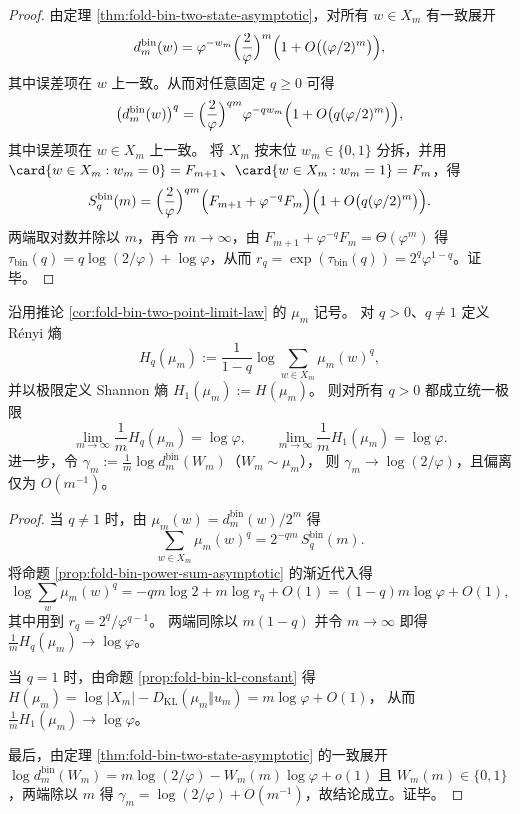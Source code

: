 \begin{proof}
由定理 \ref{thm:fold-bin-two-state-asymptotic}，对所有 \(w\in X_m\) 有一致展开
\[
d^{\mathrm{bin}}_m(w)=\varphi^{-w_m}\Bigl(\frac{2}{\varphi}\Bigr)^m\Bigl(1+O\bigl((\varphi/2)^m\bigr)\Bigr),
\]
其中误差项在 \(w\) 上一致。从而对任意固定 \(q\ge 0\) 可得
\[
\bigl(d^{\mathrm{bin}}_m(w)\bigr)^q
=\Bigl(\frac{2}{\varphi}\Bigr)^{qm}\varphi^{-q w_m}\Bigl(1+O\bigl(q(\varphi/2)^m\bigr)\Bigr),
\]
其中误差项在 \(w\in X_m\) 上一致。
将 \(X_m\) 按末位 \(w_m\in\{0,1\}\) 分拆，并用
\(
\card\{w\in X_m:w_m=0\}=F_{m+1}
\)、\(
\card\{w\in X_m:w_m=1\}=F_{m}
\)，得
\[
S_q^{\mathrm{bin}}(m)
=\Bigl(\frac{2}{\varphi}\Bigr)^{qm}\Bigl(F_{m+1}+\varphi^{-q}F_m\Bigr)\Bigl(1+O\bigl(q(\varphi/2)^m\bigr)\Bigr).
\]
两端取对数并除以 \(m\)，再令 \(m\to\infty\)，由 \(F_{m+1}+\varphi^{-q}F_m=\Theta(\varphi^m)\) 得
\(\tau_{\mathrm{bin}}(q)=q\log(2/\varphi)+\log\varphi\)，从而 \(r_q=\exp(\tau_{\mathrm{bin}}(q))=2^q\varphi^{1-q}\)。证毕。
\end{proof}

\begin{theorem}\label{thm:fold-bin-renyi-rate-collapse}
沿用推论 \ref{cor:fold-bin-two-point-limit-law} 的 \(\mu_m\) 记号。
对 \(q>0\)、\(q\neq 1\) 定义 R\'enyi 熵
\[
H_q(\mu_m):=\frac{1}{1-q}\log\sum_{w\in X_m}\mu_m(w)^q,
\]
并以极限定义 Shannon 熵 \(H_1(\mu_m):=H(\mu_m)\)。
则对所有 \(q>0\) 都成立统一极限
\[
\lim_{m\to\infty}\frac{1}{m}H_q(\mu_m)=\log\varphi,
\qquad
\lim_{m\to\infty}\frac{1}{m}H_1(\mu_m)=\log\varphi.
\]
进一步，令
\(
\gamma_m:=\frac{1}{m}\log d^{\mathrm{bin}}_m(W_m)
\)（\(W_m\sim\mu_m\)），
则 \(\gamma_m\to\log(2/\varphi)\)，且偏离仅为 \(O(m^{-1})\)。
\end{theorem}

\begin{proof}
当 \(q\neq 1\) 时，由 \(\mu_m(w)=d^{\mathrm{bin}}_m(w)/2^m\) 得
\[
\sum_{w\in X_m}\mu_m(w)^q
=2^{-qm}\,S_q^{\mathrm{bin}}(m).
\]
将命题 \ref{prop:fold-bin-power-sum-asymptotic} 的渐近代入得
\[
\log\sum_{w}\mu_m(w)^q
=-qm\log 2 + m\log r_q + O(1)
=(1-q)m\log\varphi+O(1),
\]
其中用到 \(r_q=2^q/\varphi^{q-1}\)。
两端同除以 \(m(1-q)\) 并令 \(m\to\infty\) 即得 \(\frac{1}{m}H_q(\mu_m)\to\log\varphi\)。
\par
当 \(q=1\) 时，由命题 \ref{prop:fold-bin-kl-constant} 得
\(
H(\mu_m)=\log|X_m|-D_{\mathrm{KL}}(\mu_m\Vert u_m)
=m\log\varphi+O(1)
\)，
从而 \(\frac{1}{m}H_1(\mu_m)\to\log\varphi\)。
\par
最后，由定理 \ref{thm:fold-bin-two-state-asymptotic} 的一致展开
\(
\log d^{\mathrm{bin}}_m(W_m)=m\log(2/\varphi)-W_m(m)\log\varphi+o(1)
\)
且 \(W_m(m)\in\{0,1\}\)，两端除以 \(m\) 得
\(
\gamma_m=\log(2/\varphi)+O(m^{-1})
\)，故结论成立。证毕。
\end{proof}

